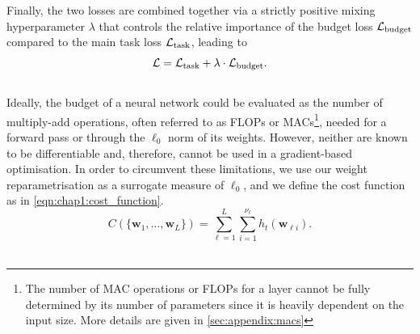 Finally, the two losses are combined together via a strictly positive mixing
hyperparameter $\lambda$ that controls the relative importance of the budget loss
${\cal L}_\text{budget}$ compared to the main task loss ${\cal L}_\text{task}$,
leading to\\

\begin{equation}
  \label{eqn:chap1:globalloss}
  {\cal L} =  {\cal L}_\text{task} + \lambda \cdot {\cal L}_\text{budget}.
\end{equation} \\

Ideally, the budget of a neural network could be evaluated as the number of
multiply-add operations, often referred to as \acp{FLOP} or
\acp{MAC}\footnote{The number of \ac{MAC} operations  or \acp{FLOP} for a layer
  cannot be fully determined by its number of parameters since it is heavily
  dependent on the input size. More details are given in
  \cref{sec:appendix:macs}}, needed for a forward pass or through the $\ell_0$
norm of its weights. However, neither are known to be differentiable and,
therefore, cannot be used in a gradient-based optimisation. In order to
circumvent these limitations, we use our weight reparametrisation as a surrogate
measure of $\ell_0$, and we define the cost function as in
\cref{eqn:chap1:cost_function}.\\

\begin{equation}
  \label{eqn:chap1:cost_function}
  C(\{\mathbf{w}_1,\dots, \mathbf{w}_L\}) = \displaystyle \sum_{\ell=1}^{L} \sum_{i=1}^{\nu_\ell} h_t(\mathbf{w}_{\ell i}).
\end{equation} \\


